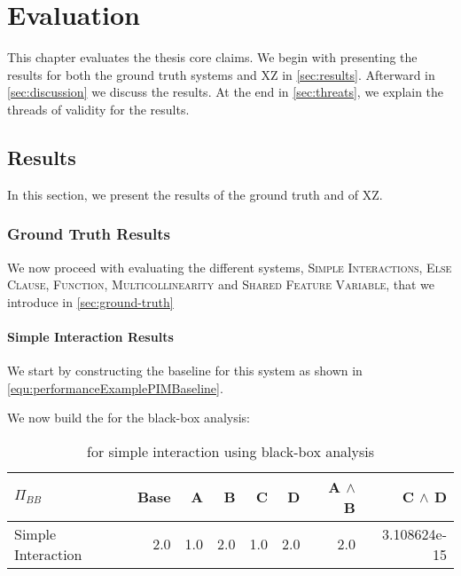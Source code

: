 \chapter{Evaluation}\label{ch:evaluation}
\lstset{style=myStyle}

This chapter evaluates the thesis core claims. 
We begin with presenting the results for both the ground truth systems and \textsc{XZ} in \autoref{sec:results}.
Afterward in \autoref{sec:discussion} we discuss the results. At the end in \autoref{sec:threats}, we explain the threads of validity for the results.

\section{Results}\label{sec:results}

In this section, we present the results of the ground truth and of \textsc{XZ}.

\subsection{Ground Truth Results}
We now proceed with evaluating the different systems, \textsc{Simple Interactions}, \textsc{Else Clause}, \textsc{Function}, \textsc{Multicollinearity} 
and \textsc{Shared Feature Variable}, that we introduce in \autoref{sec:ground-truth}

\subsubsection*{Simple Interaction Results}
We start by constructing the baseline 
{\perfInfluenceModel} for this system as shown in \autoref{equ:performanceExamplePIMBaseline}.

We now build the {\perfInfluenceModel} for the black-box analysis:

\begin{table}[H]
    \centering
    \begin{tabular}{lrrrrrrr}
    \toprule
    $\Pi_{BB}$    & Base & A & B & C & D & A $\land$ B & C $\land$ D  \\
    \midrule
    Simple Interaction &   2.0 &  1.0 &  2.0 &  1.0 &  2.0 &   2.0 &  3.108624e-15 \\
    \bottomrule
    \end{tabular}
    \caption{{\perfInfluenceModel} for simple interaction using black-box analysis}
\end{table}

